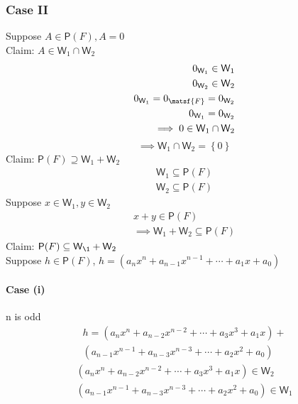 \documentclass[letterpaper,12pt]{article}
\newcommand{\?}{\stackrel{?}{=}}
\begin{document}
\begin{spacing}{1.5}
\begin{enumerate}
\subsubsection*{Case II}
Suppose $A\in \mathsf{P}(F), A=0$\\
Claim: $A \in \mathsf{W}_1 \cap \mathsf{W}_2$
\begin{align}
0_{\mathsf{W}_1} \in \mathsf{W}_1\\
0_{\mathsf{W}_2} \in \mathsf{W}_2\\
0_{\mathsf{W}_1} = 0_\matsf{F} = 0_{\mathsf{W}_2} \\
0_{\mathsf{W}_1} = 0_{\mathsf{W}_2}\\
\implies 0 \in \mathsf{W}_1 \cap \mathsf{W}_2
\end{align}
\begin{equation}
\implies \mathsf{W}_1 \cap \mathsf{W}_2 = \left\{0\right\}
\end{equation}
Claim: $\mathsf{P}(F) \supseteq \mathsf{W}_1 + \mathsf{W}_2$
\begin{align}
\mathsf{W}_1 \subseteq \mathsf{P}(F)\\
\mathsf{W}_2 \subseteq \mathsf{P}(F)
\end{align}
Suppose $x\in \mathsf{W}_1, y\in \mathsf{W}_2$
\begin{align}
x + y \in \mathsf{P}(F) \\
\implies \mathsf{W}_1 + \mathsf{W}_2 \subseteq \mathsf{P}(F)
\end{align}
Claim: $\mathsf{P}(F) \subseteq \mathsf{W}_\1 + \mathsf{W}_2$\\
Suppose $h \in \mathsf{P}(F)$, $h = \left(a_nx^n +
  a_{n-1}x^{n-1}+\cdots+ a_1x + a_0\right)$
\paragraph{Case (i)} n is odd
\begin{multline}
h = \left(a_nx^n +  a_{n-2}x^{n-2}+\cdots+ a_3x^3 + a_1x\right)+ \\
\left(a_{n-1}x^{n-1} + a_{n-3}x^{n-3}+\cdots+ a_2x^2 + a_0\right)
\end{multline}
\begin{align}
\left(a_nx^n +  a_{n-2}x^{n-2}+\cdots+ a_3x^3 + a_1x\right) \in
\mathsf{W}_2\\
\left(a_{n-1}x^{n-1} + a_{n-3}x^{n-3}+\cdots+ a_2x^2 + a_0\right) \in
\mathsf{W}_1 
\end{align}


\end{enumerate}
\end{spacing}
\end{document}
